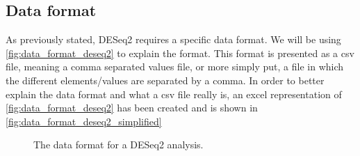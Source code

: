 \documentclass[11pt]{article}
\begin{document}
\subsection{Data format \label{deseq2 data_format}}
As previously stated, \acrshort{DESeq2} requires a specific data format. We will be using \autoref{fig:data_format_deseq2} to explain the format.
This format is presented as a \acrshort{csv} file, meaning a comma separated values file, or more simply put, a file in which the different elements/values are separated by a comma.
In order to better explain the data format and what a \acrshort{csv} file really is, an excel representation of \autoref{fig:data_format_deseq2} has been created and is shown in \autoref{fig:data_format_deseq2_simplified}

\begin{figure}[h!]
\centering
{}
\caption{The data format for a \acrshort{DESeq2} analysis.}
\label{fig:data_format_deseq2}
\end{figure}
\end{document}
